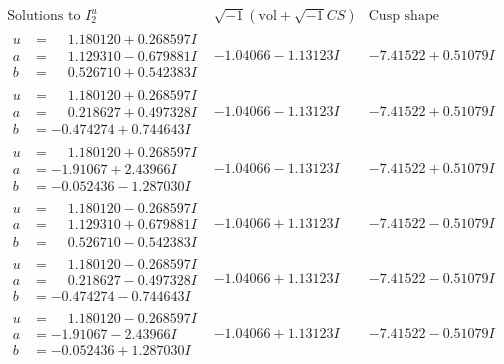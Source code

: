 \documentclass[1p]{elsarticle_modified}
\theoremstyle{definition}
\newcommand{\I}{\sqrt{-1}}
\begin{document}
$$\begin{array}{c|c|c}  
\text{Solutions to }I^u_{2}& \I (\text{vol} + \sqrt{-1}CS) & \text{Cusp shape}\\
 \hline 
\begin{aligned}
u &= \phantom{-}1.180120 + 0.268597 I \\
a &= \phantom{-}1.129310 - 0.679881 I \\
b &= \phantom{-}0.526710 + 0.542383 I\end{aligned}
 & -1.04066 - 1.13123 I & -7.41522 + 0.51079 I \\ \hline\begin{aligned}
u &= \phantom{-}1.180120 + 0.268597 I \\
a &= \phantom{-}0.218627 + 0.497328 I \\
b &= -0.474274 + 0.744643 I\end{aligned}
 & -1.04066 - 1.13123 I & -7.41522 + 0.51079 I \\ \hline\begin{aligned}
u &= \phantom{-}1.180120 + 0.268597 I \\
a &= -1.91067 + 2.43966 I \\
b &= -0.052436 - 1.287030 I\end{aligned}
 & -1.04066 - 1.13123 I & -7.41522 + 0.51079 I \\ \hline\begin{aligned}
u &= \phantom{-}1.180120 - 0.268597 I \\
a &= \phantom{-}1.129310 + 0.679881 I \\
b &= \phantom{-}0.526710 - 0.542383 I\end{aligned}
 & -1.04066 + 1.13123 I & -7.41522 - 0.51079 I \\ \hline\begin{aligned}
u &= \phantom{-}1.180120 - 0.268597 I \\
a &= \phantom{-}0.218627 - 0.497328 I \\
b &= -0.474274 - 0.744643 I\end{aligned}
 & -1.04066 + 1.13123 I & -7.41522 - 0.51079 I \\ \hline\begin{aligned}
u &= \phantom{-}1.180120 - 0.268597 I \\
a &= -1.91067 - 2.43966 I \\
b &= -0.052436 + 1.287030 I\end{aligned}
 & -1.04066 + 1.13123 I & -7.41522 - 0.51079 I \\ \hline\begin{aligned}

\end{aligned}
\end{array}$$
\end{document}
